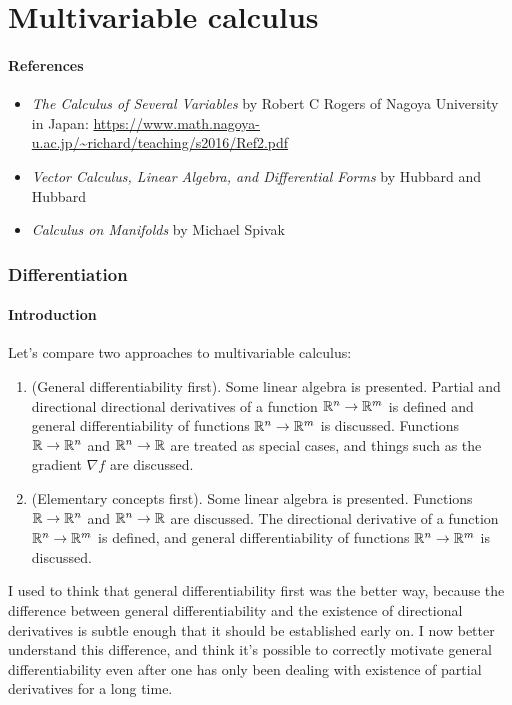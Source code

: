 \part*{Multivariable calculus}

\subsection*{References}

\begin{itemize}
    \item \textit{The Calculus of Several Variables} by Robert C Rogers of Nagoya University in Japan: \url{https://www.math.nagoya-u.ac.jp/~richard/teaching/s2016/Ref2.pdf}
    \item \textit{Vector Calculus, Linear Algebra, and Differential Forms} by Hubbard and Hubbard
    \item \textit{Calculus on Manifolds} by Michael Spivak
\end{itemize}

\section*{Differentiation}

\subsection*{Introduction}

Let's compare two approaches to multivariable calculus:

\begin{enumerate}
    \item (General differentiability first). Some linear algebra is presented. Partial and directional directional derivatives of a function $\mathbb{R}^n \rightarrow \mathbb{R}^m$ is defined and general differentiability of functions $\mathbb{R}^n \rightarrow \mathbb{R}^m$ is discussed. Functions $\mathbb{R} \rightarrow \mathbb{R}^n$ and $\mathbb{R}^n \rightarrow \mathbb{R}$ are treated as special cases, and things such as the gradient $\nabla f$ are discussed.
    \item (Elementary concepts first). Some linear algebra is presented. Functions $\mathbb{R} \rightarrow \mathbb{R}^n$ and $\mathbb{R}^n \rightarrow \mathbb{R}$ are discussed. The directional derivative of a function $\mathbb{R}^n \rightarrow \mathbb{R}^m$ is defined, and general differentiability of functions $\mathbb{R}^n \rightarrow \mathbb{R}^m$ is discussed.
\end{enumerate}

I used to think that general differentiability first was the better way, because the difference between general differentiability and the existence of directional derivatives is subtle enough that it should be established early on. I now better understand this difference, and think it's possible to correctly motivate general differentiability even after one has only been dealing with existence of partial derivatives for a long time.

